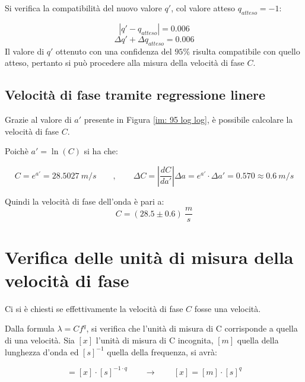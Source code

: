 \documentclass[12pt, a4paper]{article}
\begin{document}
Si verifica la compatibilità del nuovo valore $q'$, col valore atteso $q_{atteso}=-1$:
 
\begin{equation*}
    |q'-q_{atteso}| = 0.006
\end{equation*}
\begin{equation*}
    \Delta q' + \Delta q_{atteso} = 0.006 
\end{equation*}
Il valore di $q'$ ottenuto con una confidenza del $95\%$ risulta compatibile con quello atteso, pertanto si può procedere alla misura della velocità di fase $C$.





\subsection{Velocità di fase tramite regressione linere}
\label{Vel fase reg}
Grazie al valore di $a'$ presente in Figura \ref{im: 95 log log}, è possibile calcolare la velocità di fase $C$.

Poichè $a'=\ln(C)$ si ha che:

\begin{equation*}
    C=e^{a'}= 28.5027\ m/s\quad\quad , \quad\quad \Delta C=\left |\frac{d C}{d a'}\right| \Delta a= e^{a'}\cdot \Delta a'=0.570 \approx 0.6\ m/s
\end{equation*}

Quindi la velocità di fase dell'onda è pari a:
\begin{equation*}
    C=(28.5\pm 0.6)\ \frac{m}{s}
\end{equation*}

\addvspace{2.5cm}
\section{Verifica delle unità di misura della velocità di fase}
\label{sez: verifica unità di misura}
Ci si è chiesti se effettivamente la velocità di fase $C$ fosse una velocità.

Dalla formula $\lambda=Cf^{q}$, si verifica che l'unità di misura di C corrisponde a quella di una velocità. Sia $[x]$ l'unità di misura di C incognita, $[m]$ quella della lunghezza d'onda ed $[s]^{-1}$ quella della frequenza, si avrà:

\begin{equation*}
    [m]=[x]\cdot[s]^{-1 \cdot q}\quad\quad \xrightarrow{}\quad\quad [x]=[m]\cdot [s]^q
\end{equation*}
\end{document}
